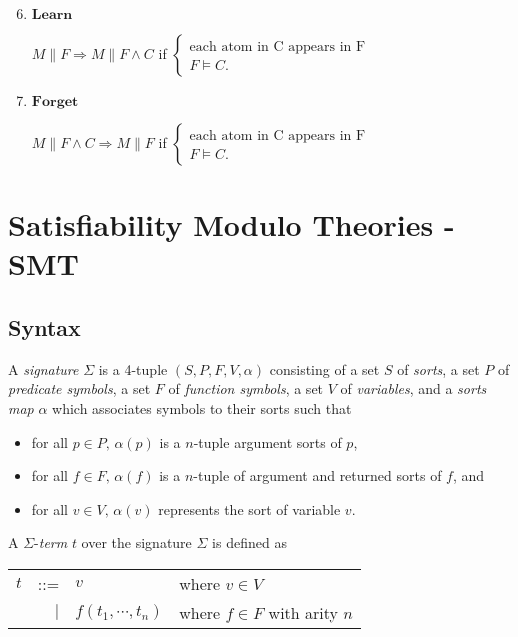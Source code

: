 \begin{enumerate}
\setcounter{enumi}{5}
\item $\mathbf{Learn}$

$M \parallel F \Longrightarrow M \parallel F \wedge C$ if $\left\{ 
  \begin{array}{l}
    \text{each atom in C appears in F} \\
    F \models C.
  \end{array} \right.$ 
  
\item $\mathbf{Forget}$

$M \parallel F \wedge C \Longrightarrow M \parallel F$ if $\left\{ 
  \begin{array}{l}
    \text{each atom in C appears in F} \\
    F \models C.
  \end{array} \right.$   
\end{enumerate}

\section{Satisfiability Modulo Theories - SMT}
\subsection{Syntax} \label{subsection:smt-syntax}
\begin{definition}
A \emph{signature} $\Sigma$ is a 4-tuple $(S, P, F, V, \alpha)$ consisting of a set $S$ of \emph{sorts}, a set $P$ of \emph{predicate symbols}, a set $F$ of \emph{function symbols}, a set $V$ of \emph{variables}, and a \emph{sorts map} $\alpha$ which associates symbols to their sorts such that
\begin{itemize}
\item for all $p \in P, \, \alpha(p)$ is a $n$-tuple argument sorts of $p$,
\item for all $f \in F, \, \alpha(f)$ is a $n$-tuple of argument and returned sorts of $f$, and
\item for all $v \in V, \, \alpha(v)$ represents the sort of variable $v$.
\end{itemize}
\end{definition}
A $\Sigma$-\emph{term} $t$ over the signature $\Sigma$ is defined as
\begin{center}
\begin{tabular}{l r l l}
$t$ &::=& $v$ & where $v \in V$\\ 
&$\mid$ & $f(t_1, \cdots, t_n)$ &where $f \in F$ with arity $n$
\end{tabular}
\end{center}



